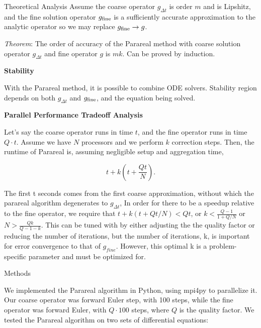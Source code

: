 \documentclass[final]{beamer}
\newlength{\onecolwid}
\begin{document}
\begin{frame}[t]
\begin{columns}[t]
\begin{column}{\onecolwid}
\begin{block}{Theoretical Analysis}
Assume the coarse operator $g_{\Delta t}$ is order $m$ and is Lipshitz, and the
fine solution operator $g_{\textnormal{fine}}$ is a sufficiently accurate
approximation to the analytic operator so we may replace $g_{\textnormal{fine}}
\to g$. 

\emph{Theorem}: The order of accuracy of the Parareal method with coarse
solution operator $g_{\Delta t}$ and fine operator $g$ is $mk$. Can be proved by
induction. 

\textbf{Stability}

With the Parareal method, it is possible to combine ODE solvers. Stability
region depends on both $g_{\Delta t}$ and $g_{\textnormal{fine}}$, and the
equation being solved. 

\textbf{Parallel Performance Tradeoff Analysis}

Let's say the coarse operator runs in time $t$, and the fine operator runs in
time $Q \cdot t$. Assume we have $N$ processors and we perform $k$ correction
steps. Then, the runtime of Parareal is, assuming negligible setup and
aggregation time,

\begin{equation}
t + k(t + \frac{Qt}{N}).
\end{equation}

The first t seconds comes from the first coarse approximation, without which the parareal algorithm degenerates to $g_{\Delta t}$,  In order for there to be a speedup relative to the fine operator, we require
that $t + k(t + Qt/N) < Qt$, or $k < \frac{Q - 1}{1 + Q/N}$ or $N > \frac{Qk}{Q
- 1 - k}$. This can be tuned with by either adjusting the the quality factor or reducing the number of iterations, but the number of iterations, k, is important for error convergence to that of $g_{fine}$.  However, this optimal k is a problem-specific parameter and must be optimized for.

\end{block}


\begin{block}{Methods}

We implemented the Parareal algorithm in Python, using mpi4py to parallelize it.
Our coarse operator was forward Euler step, with 100 steps, while the fine
operator was forward Euler, with $Q \cdot 100$ steps, where $Q$ is the quality
factor. We tested the Parareal algorithm on two sets of differential equations:


\end{block}
\end{column}
\end{columns}
\end{frame}
\end{document}

